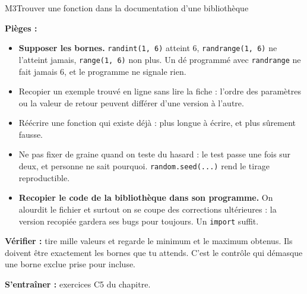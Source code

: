 \begin{fichemethode}{M3}{Trouver une fonction dans la documentation d'une bibliothèque}

\textbf{Pièges :}
\begin{itemize}
  \item \textbf{Supposer les bornes.} \lstinline{randint(1, 6)} atteint $6$,
    \lstinline{randrange(1, 6)} ne l'atteint jamais, \lstinline{range(1, 6)} non plus. Un
    dé programmé avec \lstinline{randrange} ne fait jamais $6$, et le programme ne signale
    rien.
  \item Recopier un exemple trouvé en ligne sans lire la fiche : l'ordre des paramètres ou
    la valeur de retour peuvent différer d'une version à l'autre.
  \item Réécrire une fonction qui existe déjà : plus longue à écrire, et plus sûrement
    fausse.
  \item Ne pas fixer de graine quand on teste du hasard : le test passe une fois sur deux,
    et personne ne sait pourquoi. \lstinline{random.seed(...)} rend le tirage reproductible.
  \item \textbf{Recopier le code de la bibliothèque dans son programme.} On alourdit le
    fichier et surtout on se coupe des corrections ultérieures : la version recopiée gardera
    ses bugs pour toujours. Un \lstinline{import} suffit.
\end{itemize}

\textbf{Vérifier :} tire mille valeurs et regarde le minimum et le maximum obtenus. Ils
doivent être exactement les bornes que tu attends. C'est le contrôle qui démasque une borne
exclue prise pour incluse.

\textbf{S'entraîner :} exercices C5 du chapitre.
\end{fichemethode}
